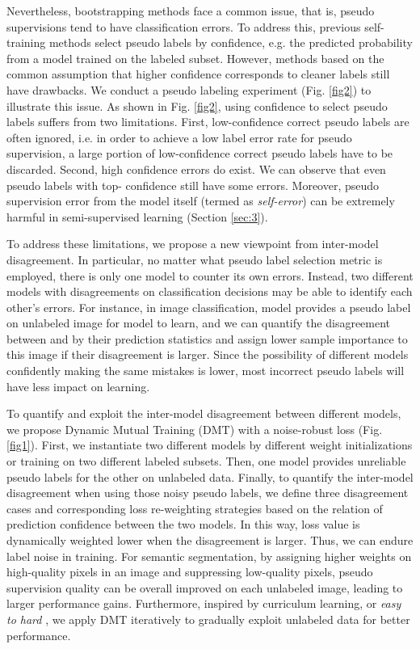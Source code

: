 \documentclass[preprint,review,10pt]{elsarticle}
\begin{document}
Nevertheless, bootstrapping methods face a common issue, that is, pseudo supervisions tend to have classification errors. To address this, previous self-training methods \cite{lee2013pseudo,hung,cbst} select pseudo labels by confidence, e.g. the predicted probability from a model trained on the labeled subset. However, methods based on the common assumption that higher confidence corresponds to cleaner labels still have drawbacks. We conduct a pseudo labeling experiment (Fig. \ref{fig2}) to illustrate this issue.
As shown in Fig. \ref{fig2}, using confidence to select pseudo labels suffers from two limitations. First, low-confidence correct pseudo labels are often ignored, i.e. in order to achieve a low label error rate for pseudo supervision, a large portion of low-confidence correct pseudo labels have to be discarded. Second, high confidence errors do exist. We can observe that even pseudo labels with top- confidence still have some errors.
Moreover, pseudo supervision error from the model itself (termed as \textit{self-error}) can be extremely harmful in semi-supervised learning (Section \ref{sec:3}).

To address these limitations, we propose a new viewpoint from inter-model disagreement. In particular, no matter what pseudo label selection metric is employed, there is only one model to counter its own errors. Instead, two different models with disagreements on classification decisions may be able to identify each other's errors. For instance, in image classification, model  provides a pseudo label on unlabeled image  for model  to learn, and we can quantify the disagreement between  and  by their prediction statistics and assign lower sample importance to this image if their disagreement is larger. Since the possibility of different models confidently making the same mistakes is lower, most incorrect pseudo labels will have less impact on learning.

To quantify and exploit the inter-model disagreement between different models, we propose Dynamic Mutual Training (DMT) with a noise-robust loss (Fig. \ref{fig1}). First, we instantiate two different models by different weight initializations or training on two different labeled subsets. Then, one model provides unreliable pseudo labels for the other on unlabeled data. Finally, to quantify the inter-model disagreement when using those noisy pseudo labels, we define three disagreement cases and corresponding loss re-weighting strategies based on the relation of prediction confidence between the two models. In this way, loss value is dynamically weighted lower when the disagreement is larger. Thus, we can endure label noise in training. For semantic segmentation, by assigning higher weights on high-quality pixels in an image and suppressing low-quality pixels, pseudo supervision quality can be overall improved on each unlabeled image, leading to larger performance gains. Furthermore, inspired by 
curriculum learning, or \textit{easy to hard} \cite{bengio2009curriculum}, we apply DMT iteratively to gradually exploit unlabeled data for better performance.
\end{document}
